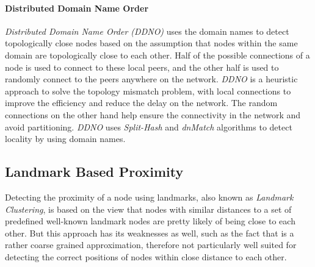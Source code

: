 \documentclass[acmcsur]{acmtrans2m}
\begin{document}
\paragraph*{\bf Distributed Domain Name Order}

%

\emph{Distributed Domain Name Order (DDNO)} \cite{zeinalipour-yazti_ddno_2005}
uses the domain names to detect topologically close nodes based on the
assumption that nodes within the same domain are topologically close to each
other. Half of the possible connections of a node is used to connect to these
local peers, and the other half is used to randomly connect to the peers
anywhere on the network.  \textit{DDNO} is a heuristic approach to solve the
topology mismatch problem, with local connections to improve the efficiency and
reduce the delay on the network.  The random connections on the other hand help
ensure the connectivity in the network and avoid partitioning. \textit{DDNO}
uses \textit{Split-Hash} and \textit{dnMatch} algorithms to detect locality by
using domain names.

\subsection{Landmark Based Proximity}\label{sec:landmark}

Detecting the proximity of a node using landmarks, also known as \textit{Landmark
Clustering}, is based on the view that nodes with similar distances to a
set of predefined well-known landmark nodes are pretty likely of being close to
each other. But this approach has its weaknesses as well, such as the fact that
is a rather coarse grained approximation, therefore not particularly well suited
for detecting the correct positions of nodes within close distance to each other.
\end{document}
